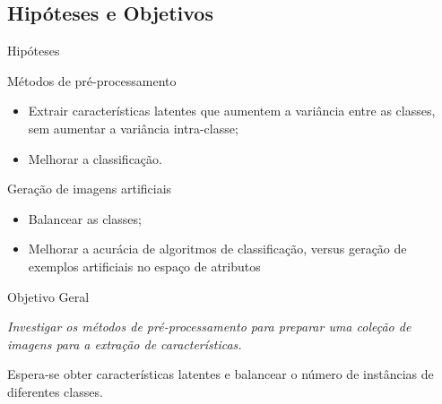\documentclass{beamer}
\begin{document}
\subsection{Hipóteses e Objetivos}
\setlength\leftmargini{1em}
\justifying
 \begin{frame}{Hipóteses}
  \begin{block}{Métodos de pré-processamento}
    \justifying
    \begin{itemize}
      \item Extrair características latentes que aumentem a variância entre as classes, sem aumentar a variância intra-classe;
      \item Melhorar a classificação.
    \end{itemize}
  \end{block}
  \begin{block}{Geração de imagens artificiais}
    \justifying
    \begin{itemize}
      \item Balancear as classes;
      \item Melhorar a acurácia de algoritmos de classificação, versus geração de exemplos artificiais no espaço de atributos
    \end{itemize}
  \end{block}
\end{frame}
\begin{frame}{Objetivo Geral}
\setlength\leftmargini{1em}
\justifying
  \begin{block}{}
  \justifying
  \emph{Investigar os métodos de pré-processamento para preparar uma coleção de imagens para a extração de características.}

  \vspace{5mm}
  Espera-se obter características latentes e balancear o número de instâncias de diferentes classes.
  \end{block}
\end{frame}
\end{document}
